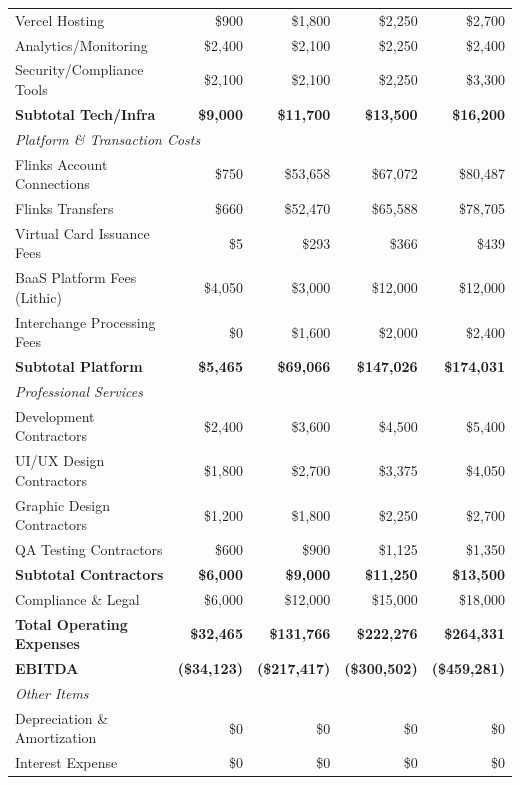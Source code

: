 \documentclass[11pt,letterpaper]{article}
\begin{document}
\begin{center}
\begin{longtable}{|l|r|r|r|r|}
Vercel Hosting & \$900 & \$1,800 & \$2,250 & \$2,700 \\
Analytics/Monitoring & \$2,400 & \$2,100 & \$2,250 & \$2,400 \\
Security/Compliance Tools & \$2,100 & \$2,100 & \$2,250 & \$3,300 \\
\textbf{Subtotal Tech/Infra} & \textbf{\$9,000} & \textbf{\$11,700} & \textbf{\$13,500} & \textbf{\$16,200} \\
\hline
\multicolumn{5}{|l|}{\textit{Platform \& Transaction Costs}} \\
\hline
Flinks Account Connections & \$750 & \$53,658 & \$67,072 & \$80,487 \\
Flinks Transfers & \$660 & \$52,470 & \$65,588 & \$78,705 \\
Virtual Card Issuance Fees & \$5 & \$293 & \$366 & \$439 \\
BaaS Platform Fees (Lithic) & \$4,050 & \$3,000 & \$12,000 & \$12,000 \\
Interchange Processing Fees & \$0 & \$1,600 & \$2,000 & \$2,400 \\
\textbf{Subtotal Platform} & \textbf{\$5,465} & \textbf{\$69,066} & \textbf{\$147,026} & \textbf{\$174,031} \\
\hline
\multicolumn{5}{|l|}{\textit{Professional Services}} \\
\hline
Development Contractors & \$2,400 & \$3,600 & \$4,500 & \$5,400 \\
UI/UX Design Contractors & \$1,800 & \$2,700 & \$3,375 & \$4,050 \\
Graphic Design Contractors & \$1,200 & \$1,800 & \$2,250 & \$2,700 \\
QA Testing Contractors & \$600 & \$900 & \$1,125 & \$1,350 \\
\textbf{Subtotal Contractors} & \textbf{\$6,000} & \textbf{\$9,000} & \textbf{\$11,250} & \textbf{\$13,500} \\
\hline
Compliance \& Legal & \$6,000 & \$12,000 & \$15,000 & \$18,000 \\
\hline
\textbf{Total Operating Expenses} & \textbf{\$32,465} & \textbf{\$131,766} & \textbf{\$222,276} & \textbf{\$264,331} \\
\hline
\textbf{EBITDA} & \textbf{(\$34,123)} & \textbf{(\$217,417)} & \textbf{(\$300,502)} & \textbf{(\$459,281)} \\
\hline
\multicolumn{5}{|l|}{\textit{Other Items}} \\
\hline
Depreciation \& Amortization & \$0 & \$0 & \$0 & \$0 \\
Interest Expense & \$0 & \$0 & \$0 & \$0 \\

\end{longtable}
\end{center}
\end{document}
